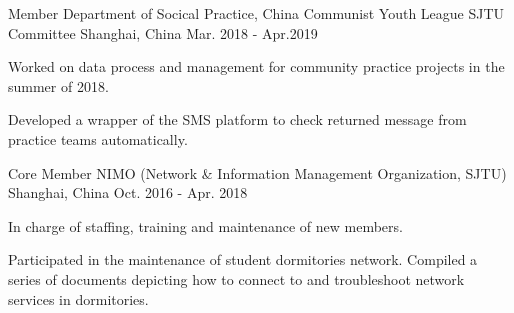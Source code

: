 


\begin{cventries}


    \cventry
    {Member} %
    {Department of Socical Practice, China Communist Youth League SJTU Committee} %
    {Shanghai, China} %
    {Mar. 2018 - Apr.2019} %
    { %
        \begin{cvitems}
            \item {Worked on data process and management for community practice projects in the summer of 2018.}
            \item {Developed a wrapper of the SMS platform to check returned message from practice teams automatically.}
        \end{cvitems}
    }


    \cventry
    {Core Member} %
    {NIMO (Network \& Information Management Organization, SJTU)} %
    {Shanghai, China} %
    {Oct. 2016 - Apr. 2018} %
    { %
        \begin{cvitems}
            \item {In charge of staffing, training and maintenance of new members.}
            \item {Participated in the maintenance of student dormitories network. Compiled a series of documents depicting how to connect to and troubleshoot network services in dormitories.}
        \end{cvitems}
    }


\end{cventries}
